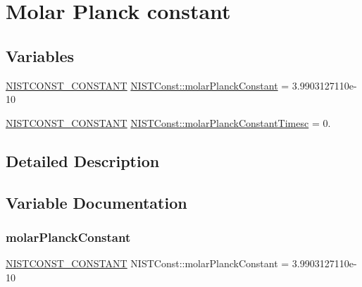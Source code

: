 \hypertarget{group___n_i_s_t_const-_molar_planck_constant}{}\section{Molar Planck constant}
\label{group___n_i_s_t_const-_molar_planck_constant}
\subsection*{Variables}
\begin{DoxyCompactItemize}
\item 
\mbox{\hyperlink{_n_i_s_t_const_8hpp_a2b0fc1d7452373f816175dd86ce26729}{N\+I\+S\+T\+C\+O\+N\+S\+T\+\_\+\+C\+O\+N\+S\+T\+A\+NT}} \mbox{\hyperlink{group___n_i_s_t_const-_molar_planck_constant_ga5fc2f65abda1ed9e9431157c44da077a}{N\+I\+S\+T\+Const\+::molar\+Planck\+Constant}} = 3.\+9903127110e-\/10
\item 
\mbox{\hyperlink{_n_i_s_t_const_8hpp_a2b0fc1d7452373f816175dd86ce26729}{N\+I\+S\+T\+C\+O\+N\+S\+T\+\_\+\+C\+O\+N\+S\+T\+A\+NT}} \mbox{\hyperlink{group___n_i_s_t_const-_molar_planck_constant_ga79708a6d196bdd250c5e965eb857a786}{N\+I\+S\+T\+Const\+::molar\+Planck\+Constant\+Timesc}} = 0.
\end{DoxyCompactItemize}


\subsection{Detailed Description}


\subsection{Variable Documentation}
\mbox{\label{group___n_i_s_t_const-_molar_planck_constant_ga5fc2f65abda1ed9e9431157c44da077a}} 
\subsubsection{\texorpdfstring{molar\+Planck\+Constant}{molarPlanckConstant}}
{\footnotesize\ttfamily \mbox{\hyperlink{_n_i_s_t_const_8hpp_a2b0fc1d7452373f816175dd86ce26729}{N\+I\+S\+T\+C\+O\+N\+S\+T\+\_\+\+C\+O\+N\+S\+T\+A\+NT}} N\+I\+S\+T\+Const\+::molar\+Planck\+Constant = 3.\+9903127110e-\/10}

